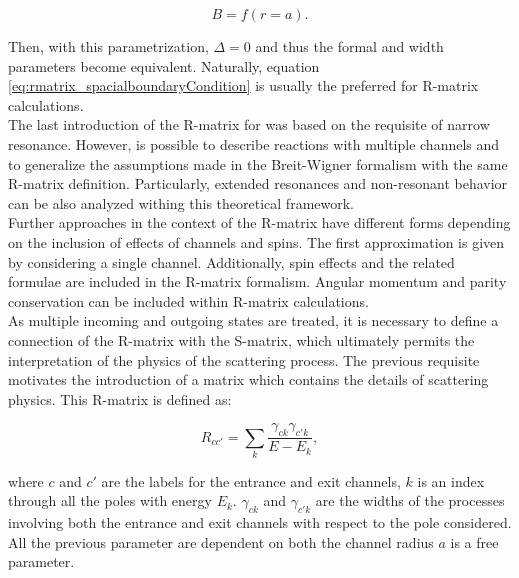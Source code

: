 \documentclass[openany]{book}
\begin{document}
\begin{equation}  \label{eq:rmatrix_spacialboundaryCondition}
	B = f(r = a). 
\end{equation}

Then, with this parametrization, $\Delta = 0$ and thus the formal and width parameters become equivalent. Naturally, equation \ref{eq:rmatrix_spacialboundaryCondition} is usually  the preferred for R-matrix calculations. \\

The last introduction of the R-matrix for was based on the requisite of narrow resonance. However,  is possible to describe reactions with multiple channels and to generalize the assumptions made in the Breit-Wigner formalism with the same R-matrix definition. Particularly, extended resonances and non-resonant behavior can be also analyzed withing this theoretical framework.\\

Further approaches in the context of the R-matrix have different forms depending on the inclusion of effects of channels and spins. The first approximation is given by considering a single channel. Additionally, spin effects and the related formulae are included in the R-matrix formalism. Angular momentum and parity conservation can be included within R-matrix calculations. \\

As multiple incoming and outgoing states are treated, it is necessary to define a connection of the R-matrix with the S-matrix, which ultimately permits the interpretation of the physics of the scattering process. The previous requisite motivates the introduction of a matrix which contains the details of scattering physics. This R-matrix is defined as:

\begin{equation}  \label{eq:rmatrix_elements}
	R_{cc'} = \sum_k {\frac{\gamma_{ck} \gamma_{c'k}}{E - E_k}}, 
\end{equation}

where $c$ and $c'$ are the labels for the entrance and exit channels, $k$ is an index through all the poles with energy $E_k$. $\gamma_{ck}$ and $\gamma_{c'k}$ are the widths of the processes involving both the entrance and exit channels with respect to the pole considered. \\

All the previous parameter are dependent on both the channel radius  $a$ is a free parameter.  \\
\end{document}
